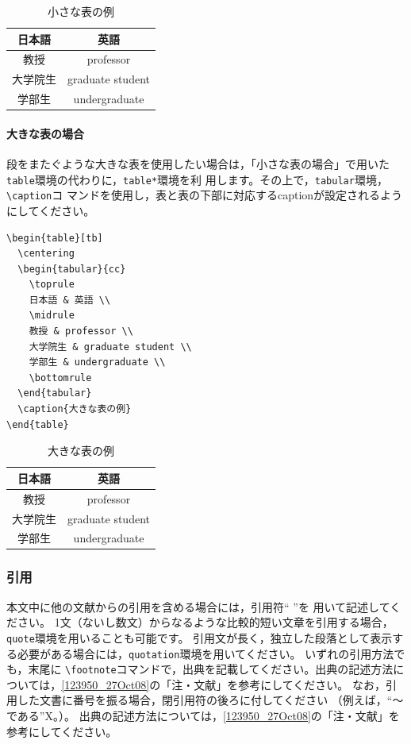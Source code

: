 \documentclass[b5paper,10pt,twocolumn,tombow]{jarticle}
\begin{document}
\begin{table}[tb]
  \centering
  \begin{tabular}{cc}
    \toprule
    日本語 & 英語 \\
    \midrule
    教授 & professor \\
    大学院生 & graduate student \\
    学部生 & undergraduate \\
    \bottomrule
  \end{tabular}
  \caption{小さな表の例}
\end{table}

\paragraph*{大きな表の場合}
段をまたぐような大きな表を使用したい場合は，「小さな表の場合」で用いた
\texttt{table}環境の代わりに，\texttt{table*}環境を利
用します。その上で，\texttt{tabular}環境，\verb|\caption|コ
マンドを使用し，表と表の下部に対応するcaptionが設定されるようにしてください。

\begin{verbatim}
\begin{table}[tb]
  \centering
  \begin{tabular}{cc}
    \toprule
    日本語 & 英語 \\
    \midrule
    教授 & professor \\
    大学院生 & graduate student \\
    学部生 & undergraduate \\
    \bottomrule
  \end{tabular}
  \caption{大きな表の例}
\end{table}
\end{verbatim}

\begin{table}[tb]
  \centering
  \begin{tabular}{cc}
    \toprule
    日本語 & 英語 \\
    \midrule
    教授 & professor \\
    大学院生 & graduate student \\
    学部生 & undergraduate \\
    \bottomrule
  \end{tabular}
  \caption{大きな表の例}
\end{table}


\subsubsection{引用}
本文中に他の文献からの引用を含める場合には，引用符`` ''を
用いて記述してください。
1文（ないし数文）からなるような比較的短い文章を引用する場合，\texttt{quote}環境を用いることも可能です。
引用文が長く，独立した段落として表示する必要がある場合には，\texttt{quotation}環境を用いてください。
いずれの引用方法でも，末尾に
\verb|\footnote|コマンドで，出典を記載してください。出典の記述方法に
ついては，\ref{123950_27Oct08}の「注・文献」を参考にしてください。
なお，引用した文書に番号を振る場合，閉引用符の後ろに付してください
（例えば，``～である''X。）。
出典の記述方法については，\ref{123950_27Oct08}の「注・文献」を参考にしてください。
\end{document}
